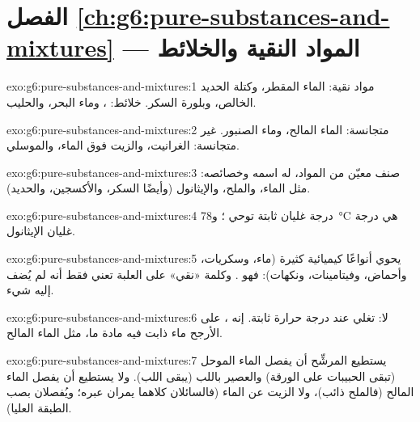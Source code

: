 \section*{الفصل \ref{ch:g6:pure-substances-and-mixtures} --- المواد النقية والخلائط}

\begin{solution}{exo:g6:pure-substances-and-mixtures:1}
مواد نقية: الماء المقطر، وكتلة الحديد الخالص، وبلورة السكر. خلائط:
، وماء البحر، والحليب.
\end{solution}

\begin{solution}{exo:g6:pure-substances-and-mixtures:2}
متجانسة: الماء المالح، وماء الصنبور. غير متجانسة: الغرانيت، والزيت فوق
الماء، والموسلي.
\end{solution}

\begin{solution}{exo:g6:pure-substances-and-mixtures:3}
صنف معيّن من المواد، له اسمه وخصائصه: مثل الماء، والملح، والإيثانول
(وأيضًا السكر، والأكسجين، والحديد).
\end{solution}

\begin{solution}{exo:g6:pure-substances-and-mixtures:4}
درجة غليان ثابتة توحي ؛ و\qty{78}{\celsius} هي درجة غليان
الإيثانول.
\end{solution}

\begin{solution}{exo:g6:pure-substances-and-mixtures:5}
يحوي أنواعًا كيميائية كثيرة (ماء، وسكريات، وأحماض، وفيتامينات، ونكهات):
فهو . وكلمة «نقي» على العلبة تعني فقط أنه لم يُضف إليه
شيء.
\end{solution}

\begin{solution}{exo:g6:pure-substances-and-mixtures:6}
لا:  تغلي عند درجة حرارة ثابتة. إنه ، على الأرجح ماء
ذابت فيه مادة ما، مثل الماء المالح.
\end{solution}

\begin{solution}{exo:g6:pure-substances-and-mixtures:7}
يستطيع المرشِّح أن يفصل الماء الموحل (تبقى الحبيبات على الورقة) والعصير
باللب (يبقى اللب). ولا يستطيع أن يفصل الماء المالح (فالملح ذائب)، ولا
الزيت عن الماء (فالسائلان كلاهما يمران عبره؛ ويُفصلان بصب الطبقة
العليا).
\end{solution}

